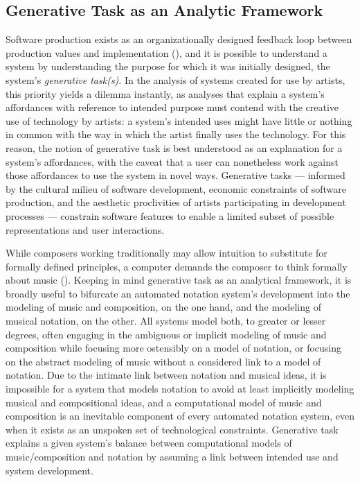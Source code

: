 \subsection{Generative Task as an Analytic Framework}
Software production exists as an organizationally designed feedback loop between production values and implementation (\cite{Derniame:1999fk}), and it is possible to understand a system by understanding the purpose for which it was initially designed, the system's \emph{generative task(s)}. In the analysis of systems created for use by artists, this priority yields a dilemma instantly, as analyses that explain a system's affordances with reference to intended purpose must contend with the creative use of technology by artists: a system's intended uses might have little or nothing in common with the way in which the artist finally uses the technology. For this reason, the notion of generative task is best understood as an explanation for a system's affordances, with the caveat that a user can nonetheless work against those affordances to use the system in novel ways. Generative tasks --- informed by the cultural milieu of software development, economic constraints of software production, and the aesthetic proclivities of artists participating in development processes --- constrain software features to enable a limited subset of possible representations and user interactions.

While composers working traditionally may allow intuition to substitute for formally defined principles, a computer demands the composer to think formally about music (\cite{Xenakis:1992rq}). Keeping in mind generative task as an analytical framework, it is broadly useful to bifurcate an automated notation system's development into the modeling of music and composition, on the one hand, and the modeling of musical notation, on the other. All systems model both, to greater or lesser degrees, often engaging in the ambiguous or implicit modeling of music and composition while focusing more ostensibly on a model of notation, or focusing on the abstract modeling of music without a considered link to a model of notation. Due to the intimate link between notation and musical ideas, it is impossible for a system that models notation to avoid at least implicitly modeling musical and compositional ideas, and a computational model of music and composition is an inevitable component of every automated notation system, even when it exists as an unspoken set of technological constraints. Generative task explains a given system's balance between computational models of music/composition and notation by assuming a link between intended use and system development.

